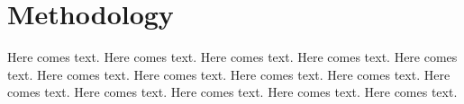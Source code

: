 \chapter{Methodology}

Here comes text. Here comes text. Here comes text. Here comes text. Here comes text. Here comes text. Here comes text. Here comes text. Here comes text. Here comes text. Here comes text. Here comes text. Here comes text. Here comes text.